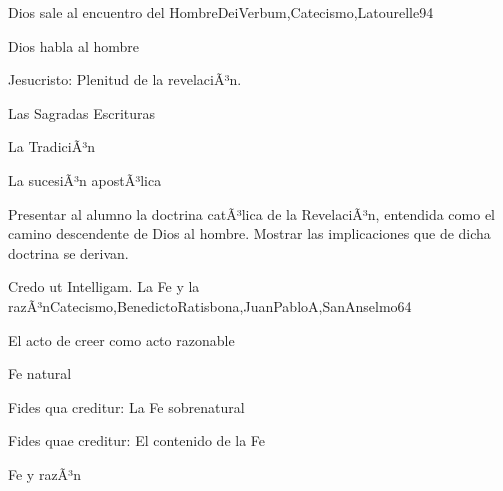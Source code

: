 \begin{syllabus}
\begin{unit}{Dios sale al encuentro del Hombre}{DeiVerbum,Catecismo,Latourelle}{9}{4}
\begin{topics}
      \item Dios habla al hombre
      \item Jesucristo: Plenitud de la revelaciÃ³n.
      \item Las Sagradas Escrituras
      \item La TradiciÃ³n
      \item La sucesiÃ³n apostÃ³lica
\end{topics}

\begin{unitgoals}
      \item Presentar al alumno la doctrina catÃ³lica de la RevelaciÃ³n,  entendida como el camino descendente de Dios al hombre.
Mostrar las implicaciones que de dicha doctrina se derivan.
\end{unitgoals}
\end{unit}

\begin{unit}{Credo ut Intelligam. La Fe y la razÃ³n}{Catecismo,BenedictoRatisbona,JuanPabloA,SanAnselmo}{6}{4}
\begin{topics}
      \item El acto de creer como acto razonable
      \item Fe natural 
      \item Fides qua creditur: La Fe sobrenatural
      \item Fides quae creditur: El contenido de la Fe
      \item Fe y razÃ³n

\end{topics}

\begin{unitgoals}
      \item 
\end{unitgoals}
\end{unit}


\end{syllabus}
